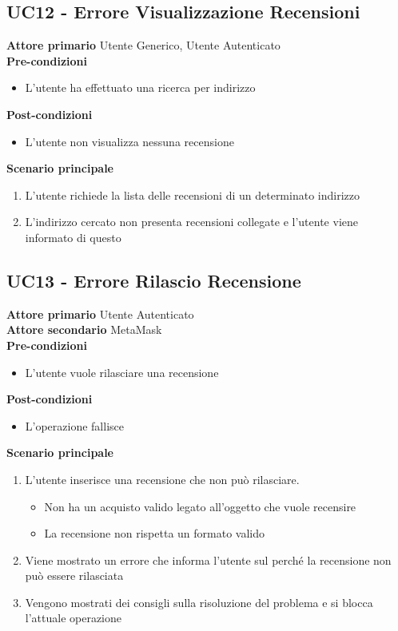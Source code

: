 \subsection{UC12 - Errore Visualizzazione Recensioni}
\label{UC12}
\textbf{Attore primario} Utente Generico, Utente Autenticato \\
\textbf{Pre-condizioni}
\begin{itemize}
    \item L'utente ha effettuato una ricerca per indirizzo
\end{itemize}
\textbf{Post-condizioni}
\begin{itemize}
    \item  L'utente non visualizza nessuna recensione
\end{itemize}
\textbf{Scenario principale}
\begin{enumerate}
    \item L'utente richiede la lista delle recensioni di un determinato indirizzo
    \item L'indirizzo cercato non presenta recensioni collegate e l'utente viene
          informato di questo
\end{enumerate}

\subsection{UC13 - Errore Rilascio Recensione}
\label{UC13}
\textbf{Attore primario} Utente Autenticato \\
\textbf{Attore secondario} MetaMask \\
\textbf{Pre-condizioni}
\begin{itemize}
    \item L'utente vuole rilasciare una recensione
\end{itemize}
\textbf{Post-condizioni}
\begin{itemize}
    \item L'operazione fallisce
\end{itemize}
\textbf{Scenario principale}
\begin{enumerate}
    \item L'utente inserisce una recensione che non può rilasciare.
          \begin{itemize}
              \item Non ha un acquisto valido legato all'oggetto che vuole recensire
              \item La recensione non rispetta un formato valido
          \end{itemize}
    \item Viene mostrato un errore che informa l'utente sul perché la recensione non può
          essere rilasciata
    \item Vengono mostrati dei consigli sulla risoluzione del problema e si blocca
          l'attuale operazione
\end{enumerate}

